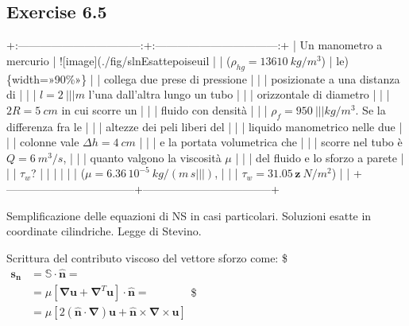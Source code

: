 \documentclass[letterpaper,10pt,italian]{jupyterBook}
\begin{document}
\sphinxstepscope


\subsection{Exercise 6.5}
\label{\detokenize{polimi/fluidmechanics-ita/template/capitoli/06_slnEsatte/0605in:exercise-6-5}}\label{\detokenize{polimi/fluidmechanics-ita/template/capitoli/06_slnEsatte/0605in:fluid-mechanics-exact-solutions-ex05}}\label{\detokenize{polimi/fluidmechanics-ita/template/capitoli/06_slnEsatte/0605in::doc}}
\sphinxAtStartPar
+:———————————:+:———————————:+
| Un manometro a mercurio           | !{[}image{]}(./fig/slnEsatte\sphinxhyphen{}poiseuil |
| (\(\rho_{hg} = 13610 \  kg/m^3\))   | le)\{width=»90\%»\}                  |
| collega due prese di pressione    |                                   |
| posizionate a una distanza di     |                                   |
| \(l = 2 \                          |                                   |
| m\) l’una dall’altra lungo un tubo |                                   |
| orizzontale di diametro           |                                   |
| \(2R = 5 \ cm\) in cui scorre un    |                                   |
| fluido con densità                |                                   |
| \(\rho_{f} = 950 \                 |                                   |
| kg/m^3\). Se la differenza fra le  |                                   |
| altezze dei peli liberi del       |                                   |
| liquido manometrico nelle due     |                                   |
| colonne vale \(\Delta h = 4 \ cm\)  |                                   |
| e la portata volumetrica che      |                                   |
| scorre nel tubo è \(Q= 6\ m^3/s\),  |                                   |
| quanto valgono la viscosità \(\mu\) |                                   |
| del fluido e lo sforzo a parete   |                                   |
| \(\tau_w\)?                         |                                   |
|                                   |                                   |
| (\(\mu = 6.36\,10^{-5} \ kg/(m\, s |                                   |
| )\),                               |                                   |
| \(\tau_w = 31.05\, \bm{z}\ N/m^2\)) |                                   |
+———————————–+———————————–+

\sphinxAtStartPar
Semplificazione delle equazioni di NS in casi particolari. Soluzioni
esatte in coordinate cilindriche. Legge di Stevino.

\sphinxAtStartPar
Scrittura del contributo viscoso del vettore sforzo come:
\$\(\begin{aligned}
  \bm{s_n} & = \mathbb{S} \cdot \bm{\hat{n}} = \\
           & = \mu [\bm{\nabla} \bm{u} + \bm{\nabla}^T \bm{u}] \cdot \bm{\hat{n}} = \\
           & = \mu \left[ 2 (\bm{\hat{n}} \cdot \bm{\nabla} ) \bm{u} + \bm{\hat{n}} \times \bm{\nabla} \times \bm{u}  \right]
\end{aligned}\)\$
\end{document}
